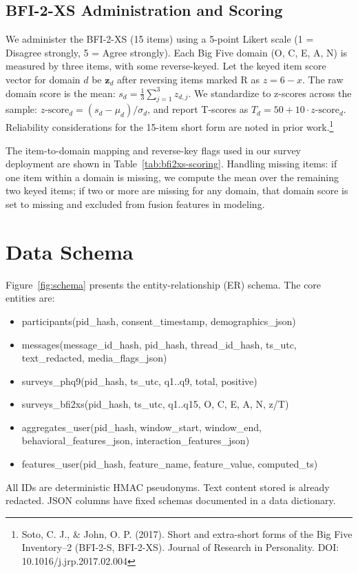 \subsection{BFI-2-XS Administration and Scoring}
We administer the BFI-2-XS (15 items) using a 5-point Likert scale (1 = Disagree strongly, 5 = Agree strongly). Each Big Five domain (O, C, E, A, N) is measured by three items, with some reverse-keyed. Let the keyed item score vector for domain \(d\) be \(\mathbf{z}_d\) after reversing items marked R as \(z = 6 - x\). The raw domain score is the mean: \(s_d = \frac{1}{3}\sum_{j=1}^3 z_{d,j}\). We standardize to z-scores across the sample: \(z\text{-score}_d = (s_d - \mu_d)/\sigma_d\), and report T-scores as \(T_d = 50 + 10\cdot z\text{-score}_d\). Reliability considerations for the 15-item short form are noted in prior work.\footnote{Soto, C. J., \& John, O. P. (2017). Short and extra-short forms of the Big Five Inventory–2 (BFI-2-S, BFI-2-XS). Journal of Research in Personality. DOI: 10.1016/j.jrp.2017.02.004}

The item-to-domain mapping and reverse-key flags used in our survey deployment are shown in Table~\ref{tab:bfi2xs-scoring}. Handling missing items: if one item within a domain is missing, we compute the mean over the remaining two keyed items; if two or more are missing for any domain, that domain score is set to missing and excluded from fusion features in modeling.

\section{Data Schema}
\label{sec:dataset-schema}
Figure~\ref{fig:schema} presents the entity-relationship (ER) schema. The core entities are:
\begin{itemize}
  \item participants(pid\_hash, consent\_timestamp, demographics\_json)
  \item messages(message\_id\_hash, pid\_hash, thread\_id\_hash, ts\_utc, text\_redacted, media\_flags\_json)
  \item surveys\_phq9(pid\_hash, ts\_utc, q1..q9, total, positive)
  \item surveys\_bfi2xs(pid\_hash, ts\_utc, q1..q15, O, C, E, A, N, z/T)
  \item aggregates\_user(pid\_hash, window\_start, window\_end, behavioral\_features\_json, interaction\_features\_json)
  \item features\_user(pid\_hash, feature\_name, feature\_value, computed\_ts)
\end{itemize}
All IDs are deterministic HMAC pseudonyms. Text content stored is already redacted. JSON columns have fixed schemas documented in a data dictionary.

